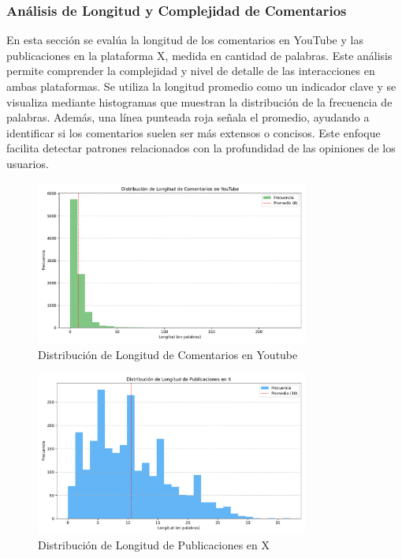 \documentclass[10pt, a4paper]{article}
\begin{document}
	\subsubsection{Análisis de Longitud y Complejidad de Comentarios}
	En esta sección se evalúa la longitud de los comentarios en YouTube y las publicaciones en la plataforma X, medida en cantidad de palabras. Este análisis permite comprender la complejidad y nivel de detalle de las interacciones en ambas plataformas. Se utiliza la longitud promedio como un indicador clave y se visualiza mediante histogramas que muestran la distribución de la frecuencia de palabras. Además, una línea punteada roja señala el promedio, ayudando a identificar si los comentarios suelen ser más extensos o concisos. Este enfoque facilita detectar patrones relacionados con la profundidad de las opiniones de los usuarios.
	
	\vspace{-3mm}
	\begin{figure}[h!]
		\centering
		\includegraphics[width=0.8\textwidth]{longitud_comentarios_youtube.pdf} %
		\vspace{-2mm}
		\caption{Distribución de Longitud de Comentarios en Youtube}
		\label{fig:longYoutube} %
	\end{figure}
	
	\begin{figure}[h!]
		\centering
		\includegraphics[width=0.8\textwidth]{longitud_publicaciones_x.pdf} %
		\vspace{-2mm}
		\caption{Distribución de Longitud de Publicaciones en X}
		\label{fig:longX} %
	\end{figure}
	
\end{document}
